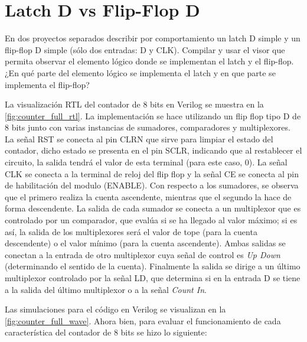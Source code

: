 \section{Latch D vs Flip-Flop D \label{sec:s4}}

\begin{center}
	\begin{minipage}{12cm}
		\begin{tcolorbox}[title=Actividad 4]
			En dos proyectos separados describir por comportamiento  un latch D simple y un flip-flop D simple (sólo dos entradas: D y CLK). Compilar y usar el visor que permita observar el elemento lógico donde se implementan el latch y el flip-flop. ¿En qué parte del elemento lógico se implementa el latch y en que parte se implementa el flip-flop?
		\end{tcolorbox}	
	\end{minipage}
\end{center}

La visualización RTL del contador de 8 bits en Verilog se muestra en la \autoref{fig:counter_full_rtl}. La implementación se hace utilizando un flip flop tipo D de 8 bits junto con varias instancias de sumadores, comparadores y multiplexores. La señal RST se conecta al pin CLRN que sirve para limpiar el estado del contador, dicho estado se presenta en el pin SCLR, indicando que al restablecer el circuito, la salida tendrá el valor de esta terminal (para este caso, 0). La señal CLK se conecta a la terminal de reloj del flip flop y la señal CE se conecta al pin de habilitación del modulo (ENABLE). Con respecto a los sumadores, se observa que el primero realiza la cuenta ascendente, mientras que el segundo la hace de forma descendente. La salida de cada sumador se conecta a un multiplexor que es controlado por un comparador, que evalúa si se ha llegado al valor máximo; si es así, la salida de los multiplexores será el valor de tope (para la cuenta descendente) o el valor mínimo (para la cuenta ascendente). Ambas salidas se conectan a la entrada de otro multiplexor cuya señal de control es \textit{Up Down} (determinando el sentido de la cuenta). Finalmente la salida se dirige a un último multiplexor controlado por la señal LD, que determina si en la entrada D se tiene a la salida del último multiplexor o a la señal \textit{Count In}.

Las simulaciones para el código en Verilog se visualizan en la \autoref{fig:counter_full_wave}. Ahora bien, para evaluar el funcionamiento de cada característica del contador de 8 bits se hizo lo siguiente:

